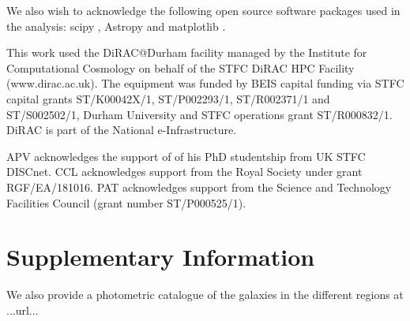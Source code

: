 \documentclass[fleqn,usenatbib]{mnras}
\begin{document}
We also wish to acknowledge the following open source software packages used in the analysis: scipy \citep{2020SciPy-NMeth}, Astropy \citep{robitaille_astropy:_2013} and matplotlib \citep{Hunter:2007}.

This work used the DiRAC@Durham facility managed by the Institute for Computational Cosmology on behalf of the STFC DiRAC HPC Facility (www.dirac.ac.uk). The equipment was funded by BEIS capital funding via STFC capital grants ST/K00042X/1, ST/P002293/1, ST/R002371/1 and ST/S002502/1, Durham University and STFC operations grant ST/R000832/1. DiRAC is part of the National e-Infrastructure.

APV acknowledges the support of of his PhD studentship from UK STFC DISCnet. CCL acknowledges support from the Royal Society under
grant RGF/EA/181016. PAT acknowledges support from the Science and Technology Facilities Council (grant number ST/P000525/1).





\section*{Supplementary Information}
We also provide a photometric catalogue of the galaxies in the different regions at ...url...


%
% 



\bsp	%
\label{lastpage}
\end{document}
